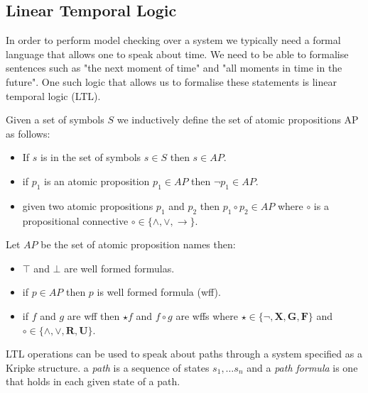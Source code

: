 \subsection{Linear Temporal Logic}
In order to perform model checking over a system we typically need a formal language that allows one to speak about time. We need to be able to formalise sentences such as "the next moment of time" and "all moments in time in the future". One such logic that allows us to formalise these statements is linear temporal logic (LTL)\cite{AP77}. 

\begin{mydef}
Given a set of symbols $S$ we inductively define the set of atomic propositions AP as follows:
\begin{itemize}
\item If $s$ is in the set of symbols $s \in S$ then $s \in AP$.

\item if $p_1$ is an atomic proposition $p_1 \in AP$ then $\neg p_1 \in AP$.

\item given two atomic propositions $p_1$ and $p_2$ then $p_1 \circ p_2 \in AP$ where $\circ$ is a propositional connective $\circ \in \{ \wedge,\vee,\to \} $.
\end{itemize} 
\end{mydef}

\begin{mydef}
Let $AP$ be the set of atomic proposition names then:

\begin{itemize}
\item $\top$ and $\bot$ are well formed formulas.
\item if $p \in AP$ then $p$ is well formed formula (wff).

\item if $f$ and $g$ are wff  then $\star f$ and $f \circ g$ are wffs where $\star \in \{\neg,\mathbf{X},\mathbf{G}, \mathbf{F}\}$ and $\circ \in \{ \wedge,\vee,\textbf{R},\textbf{U} \}$.
\end{itemize}

\end{mydef}


LTL operations can be used to speak about paths through a system specified as a Kripke structure.
a \emph{path} is a sequence of states $s_1, \ldots s_n$ and a \emph{path formula} is one that holds in each given state of a path.

